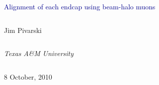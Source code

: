 \documentclass[compress]{beamer}
\begin{document}
\begin{frame}
\vfill
\begin{center}
\textcolor{darkblue}{\Large Alignment of each endcap using beam-halo muons}

\vfill
\begin{columns}
\begin{center}
\large
Jim Pivarski
\end{center}
\end{columns}

\begin{columns}
\begin{center}
\scriptsize
{\it Texas A\&M University}
\end{center}
\end{columns}

\vfill
 8 October, 2010

\end{center}
\end{frame}


\small

\end{document}
